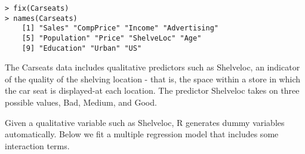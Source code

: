 \documentclass[10pt]{article}
\begin{document}
\begin{verbatim}
> fix(Carseats)
> names(Carseats)
    [1] "Sales" "CompPrice" "Income" "Advertising"
    [5] "Population" "Price" "ShelveLoc" "Age"
    [9] "Education" "Urban" "US"
\end{verbatim}

The Carseats data includes qualitative predictors such as Shelveloc, an indicator of the quality of the shelving location - that is, the space within a store in which the car seat is displayed-at each location. The predictor Shelveloc takes on three possible values, Bad, Medium, and Good.


Given a qualitative variable such as Shelveloc, R generates dummy variables automatically. Below we fit a multiple regression model that includes some interaction terms.
\end{document}
